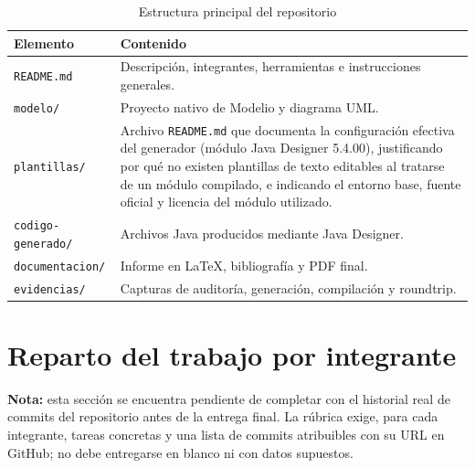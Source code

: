 \documentclass[10pt,a4paper,openany]{report}
\renewcommand{\arraystretch}{1.15}
\begin{document}
	\begin{table}[H]
		\centering
		\caption{Estructura principal del repositorio}
		\label{tab:estructura-repositorio}
		\small
		\renewcommand{\arraystretch}{1.10}
		
		\begin{tabularx}{\textwidth}{|p{4cm}|Y|}
			\hline
			\textbf{Elemento} & \textbf{Contenido} \\
			\hline
			
			\texttt{README.md} &
			Descripción, integrantes, herramientas e instrucciones generales. \\
			\hline
			
			\texttt{modelo/} &
			Proyecto nativo de Modelio y diagrama UML. \\
			\hline
			
			\texttt{plantillas/} &
			Archivo \texttt{README.md} que documenta la configuración efectiva del generador (módulo Java Designer 5.4.00), justificando por qué no existen plantillas de texto editables al tratarse de un módulo compilado, e indicando el entorno base, fuente oficial y licencia del módulo utilizado. \\
			\hline
			
			\texttt{codigo-generado/} &
			Archivos Java producidos mediante Java Designer. \\
			\hline
			
			\texttt{documentacion/} &
			Informe en LaTeX, bibliografía y PDF final. \\
			\hline
			
			\texttt{evidencias/} &
			Capturas de auditoría, generación, compilación y roundtrip. \\
			\hline
		\end{tabularx}
	\end{table}
	
	\section{Reparto del trabajo por integrante}
	
	
	\textbf{Nota:} esta sección se encuentra pendiente de completar con
	el historial real de commits del repositorio antes de la entrega
	final. La rúbrica exige, para cada integrante, tareas concretas y
	una lista de commits atribuibles con su URL en GitHub; no debe
	entregarse en blanco ni con datos supuestos.
	
\end{document}
